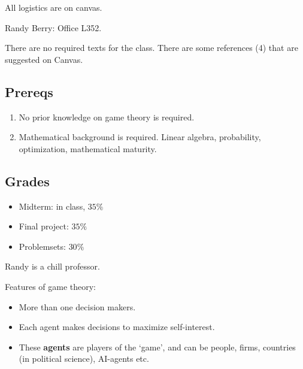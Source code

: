 \newsection
All logistics are on canvas.

Randy Berry: Office L352.

There are no required texts for the class. There are some references (4) that are suggested on Canvas. 
\subsection*{Prereqs}
\begin{enumerate}
    \item No prior knowledge on game theory is required.
    \item Mathematical background is required. Linear algebra, probability, optimization, mathematical maturity.
\end{enumerate}
\subsection*{Grades}
\begin{itemize}
    \item Midterm: in class, $35\%$
    \item Final project: $35\%$
    \item Problemsets: $30\%$
\end{itemize}
\begin{atheorem}{}{}
    Randy is a chill professor.
\end{atheorem}
\newsection
{}
Features of game theory:\begin{itemize}
    \item More than one decision makers.
    \item Each agent makes decisions to maximize self-interest.
    \item These \textbf{agents} are players of the `game', and can be people, firms, countries (in political science), AI-agents etc.
\end{itemize}


